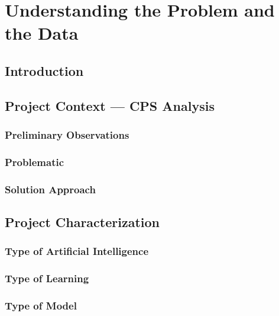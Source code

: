
\chapter{Understanding the Problem and the Data}

\section{Introduction}

\section{Project Context --- CPS Analysis}

\subsection{Preliminary Observations}

\subsection{Problematic}

\subsection{Solution Approach}

\section{Project Characterization}

\subsection{Type of Artificial Intelligence}

\subsection{Type of Learning}

\subsection{Type of Model}

